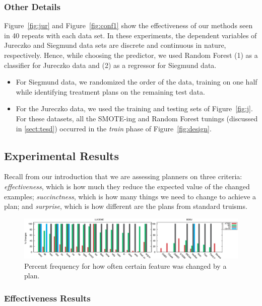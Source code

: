 \documentclass{sig-alternate}
\newcommand{\bi}{\begin{itemize}}
\newcommand{\ei}{\end{itemize}}
\newcommand{\tion}[1]{\textsection\ref{sect:#1}}
\newcommand{\fig}[1]{Figure~\ref{fig:#1}}
\begin{document}
 

 
\subsubsection{Other Details}
 
\fig{jur} and \fig{conf1} show the effectiveness of our methods seen in 40 repeats with each data set.
In these experiments,   the dependent variables of Jureczko and Siegmund data sets are discrete and continuous in nature, respectively. Hence, while choosing the predictor, we used Random Forest (1) as a classifier for Jureczko data and (2) as a regressor for Siegmund data.
\bi
\item For Siegmund data, we randomized the order of the data, training on one half while identifying treatment plans on the remaining test data. 
\item For the Jureczko data, we used the training and testing sets of \fig{j}. For these datasets,
 all the SMOTE-ing and Random Forest tunings (discussed in \tion{tesd})
occurred in the {\em train} phase of \fig{design}.
\ei
 \subsection{Experimental Results}

Recall from our introduction that we are assessing planners on three criteria:
{\em effectiveness}, which is how much they reduce the expected value of the changed examples;
{\em succinctness}, which is how many things we need to change to achieve a plan;
and {\em surprise}, which is how different are the plans from standard truisms.




\begin{figure}[!t]
\centering
\includegraphics[width=\linewidth]{figs/Deltas-both.eps}
\caption{Percent frequency for how often certain feature was changed by a plan.}\label{fig:changed}
\end{figure}

\subsubsection{Effectiveness Results}
\end{document}
